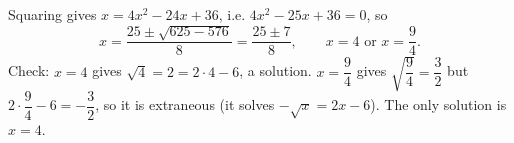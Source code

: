 Squaring gives $x=4x^2-24x+36$, i.e. $4x^2-25x+36=0$, so
\[
x=\dfrac{25\pm\sqrt{625-576}}{8}=\dfrac{25\pm7}{8},\qquad x=4\text{ or }x=\dfrac{9}{4} .
\]
Check: $x=4$ gives $\sqrt4=2=2\cdot4-6$, a solution. $x=\dfrac{9}{4}$ gives $\sqrt{\dfrac{9}{4}}=\dfrac{3}{2}$ but $2\cdot\dfrac{9}{4}-6=-\dfrac{3}{2}$, so it is extraneous (it solves $-\sqrt x=2x-6$). The only solution is $\boxed{x=4}$.
